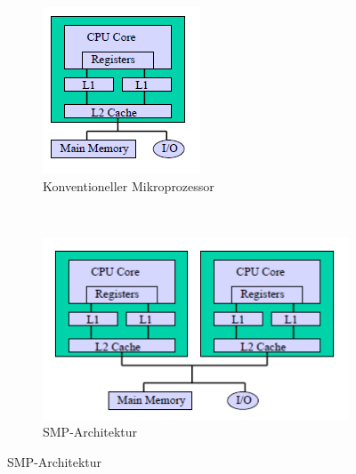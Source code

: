 \begin{figure}
	\centering
	\begin{subfigure}[b]{0.15\textwidth}
		\includegraphics[width=\textwidth]{fig/mc_one}
		\caption{Konventioneller Mikroprozessor}
		\label{fig:mc_conventional}
	\end{subfigure}
	~
	\begin{subfigure}[b]{0.27\textwidth}
		\includegraphics[width=\textwidth]{fig/mc_simple_chip}
		\caption{SMP-Architektur}
		\label{fig:mc_simple_chip}
	\end{subfigure}

\end{figure}
